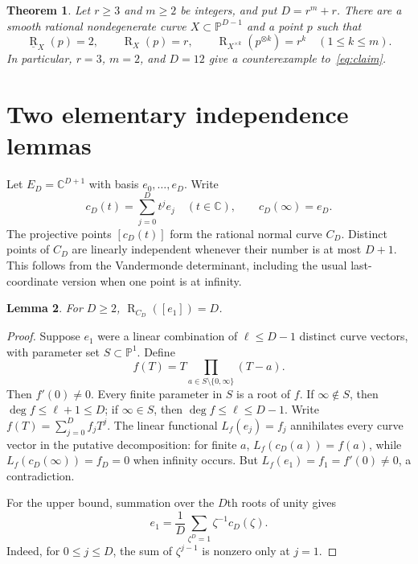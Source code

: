\documentclass[11pt]{article}
\newtheorem{theorem}{Theorem}
\newtheorem{lemma}[theorem]{Lemma}
\theoremstyle{remark}\newtheorem{remark}[theorem]{Remark}
\newcommand{\C}{\mathbb C}
\newcommand{\PP}{\mathbb P}
\newcommand{\rk}{\operatorname{R}}
\newcommand{\brk}{\underline{\operatorname{R}}}
\begin{document}
\begin{theorem}\label{thm:main}
Let $r\geq3$ and $m\geq2$ be integers, and put $D=r^m+r$. There are a smooth rational nondegenerate curve $X\subset\PP^{D-1}$ and a point $p$ such that
\[
 \brk_X(p)=2,\qquad \rk_X(p)=r,\qquad
 \rk_{X^{\times k}}(p^{\otimes k})=r^k\quad(1\leq k\leq m).
\]
In particular, $r=3$, $m=2$, and $D=12$ give a counterexample to~\eqref{eq:claim}.
\end{theorem}

\section{Two elementary independence lemmas}
Let $E_D=\C^{D+1}$ with basis $e_0,\ldots,e_D$. Write
\[
 c_D(t)=\sum_{j=0}^D t^j e_j\quad(t\in\C),\qquad c_D(\infty)=e_D.
\]
The projective points $[c_D(t)]$ form the rational normal curve $C_D$. Distinct points of $C_D$ are linearly independent whenever their number is at most $D+1$. This follows from the Vandermonde determinant, including the usual last-coordinate version when one point is at infinity.

\begin{lemma}\label{lem:tangent}
For $D\geq2$, $\rk_{C_D}([e_1])=D$.
\end{lemma}
\begin{proof}
Suppose $e_1$ were a linear combination of $\ell\leq D-1$ distinct curve vectors, with parameter set $S\subset\PP^1$. Define
\[
 f(T)=T\prod_{a\in S\setminus\{0,\infty\}}(T-a).
\]
Then $f'(0)\neq0$. Every finite parameter in $S$ is a root of $f$.
If $\infty\notin S$, then $\deg f\leq\ell+1\leq D$; if $\infty\in S$, then $\deg f\leq\ell\leq D-1$.
Write $f(T)=\sum_{j=0}^D f_jT^j$. The linear functional $L_f(e_j)=f_j$ annihilates every curve vector in the putative decomposition: for finite $a$, $L_f(c_D(a))=f(a)$, while $L_f(c_D(\infty))=f_D=0$ when infinity occurs. But $L_f(e_1)=f_1=f'(0)\neq0$, a contradiction.

For the upper bound, summation over the $D$th roots of unity gives
\[
 e_1=\frac1D\sum_{\zeta^D=1}\zeta^{-1}c_D(\zeta).
\]
Indeed, for $0\leq j\leq D$, the sum of $\zeta^{j-1}$ is nonzero only at $j=1$.
\end{proof}
\end{document}
